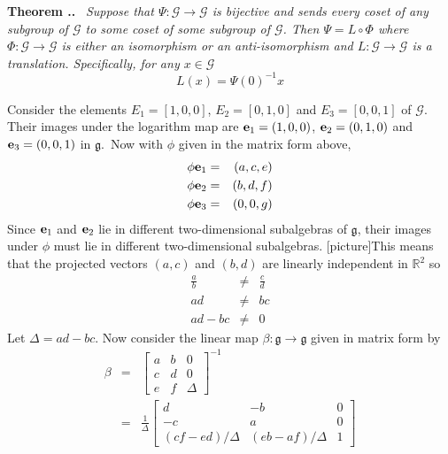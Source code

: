 \documentclass[honours]{UNSWthesis}
\newcommand{\R}{\mathbb{R}}
\newcommand{\G}{\mathcal{G}}
\newcommand{\g}{\mathfrak{g}}
\newcommand{\1}{\mathbf{e}_{1}}
\newcommand{\2}{\mathbf{e}_{3}}
\newcommand{\3}{\mathbf{e}_{3}}
\newcounter{Item}[section]
\newenvironment{Theorem}{\medskip
                            \refstepcounter{Item}
                            \noindent
                           {\bf Theorem \thesection.\theItem.}\ %
                            \begingroup \sl}
                           {\endgroup\medskip}
\begin{document}
\begin{Theorem}
Suppose that $\Psi: \G \longrightarrow \G$ is bijective and sends every coset of \emph{any} subgroup of $\G$ to some coset of some subgroup of $\G$. Then $\Psi=L \circ \Phi$ where $\Phi:\G \longrightarrow \G$ is either an isomorphism or an anti-isomorphism and $L: \G \longrightarrow \G$ is a translation. Specifically, for any $x \in \G$
\[
L(x)=\Psi(0)^{-1}x
\]

\end{Theorem}

Consider the elements $E_{1}=[1,0,0]$, $E_{2}=[0,1,0]$ and $E_{3}=[0,0,1]$ of $\G$. Their images under the logarithm map are ${\bf e}_{1}=(1,0,0)$, ${\bf e}_{2}=(0,1,0)$ and ${\bf e}_{3}=(0,0,1)$ in $\g$.\
Now with $\phi$ given in the matrix form above,
\begin{eqnarray*}
\phi {\bf e}_{1} &=& (a,c,e) \\
\phi {\bf e}_{2} &=& (b,d,f) \\
\phi {\bf e}_{3} &=& (0,0,g)
\end{eqnarray*}
Since ${\bf e}_{1}$ and ${\bf e}_{2}$ lie in different two-dimensional subalgebras of $\g$, their images under $\phi$ must lie in different two-dimensional subalgebras. [picture]This means that the projected vectors $(a,c)$ and $(b,d)$ are linearly independent in $\R^{2}$ so 
\begin{eqnarray*}
\frac{a}{b} &\neq & \frac{c}{d} \\
ad &\neq & bc\\
ad-bc &\neq & 0 
\end{eqnarray*} Let $\Delta = ad-bc$.
Now consider the linear map $\beta:\g \longrightarrow \g$ given in matrix form by 
\begin{eqnarray*}
\beta &=& \begin{bmatrix}
a & b & 0 \\
c & d & 0 \\
e & f & \Delta
\end{bmatrix}^{-1} \\
&=& \frac{1}{\Delta}\begin{bmatrix}
d & -b & 0 \\
-c & a & 0 \\
(cf-ed)/\Delta & (eb-af)/\Delta & 1
\end{bmatrix}
\end{eqnarray*}
\end{document}
